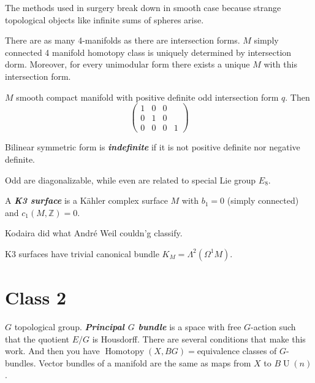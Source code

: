 \begin{remark}
	The methods used in surgery break down in smooth case because strange topological objects like infinite sums of spheres arise.
\end{remark}

\begin{thm}[Freedman, 1982]
	There are as many 4-manifolds as there are intersection forms. $M$ simply connected 4 manifold homotopy class is uniquely determined by intersection dorm. Moreover, for every unimodular form there exists a unique $M$ with this intersection form.
\end{thm}

\begin{thm}[Donaldson, 1986]\leavevmode
	$M$ smooth compact manifold with positive definite odd intersection form $q$. Then
	\[\begin{pmatrix} 1&0&0\\0&1&0\\0&0&0&1 \end{pmatrix} \]
\end{thm}

\begin{defn}
	Bilinear symmetric form is \textit{\textbf{indefinite}} if it is not positive definite nor negative definite.
\end{defn}

\begin{thm}\leavevmode
	Odd are diagonalizable, while even are related to special Lie group $E_8$.
\end{thm}

\begin{defn}
	A \textit{\textbf{K3 surface}} is a K\"ahler complex surface $M$ with $b_1=0$ (simply connected) and $c_1(M,\mathbb{Z})=0$.
\end{defn}

Kodaira did what Andr\'e Weil couldn'g classify.

 \begin{thm}
	K3 surfaces have trivial canonical bundle $K_{M}=\Lambda^2(\Omega^1M)$.
\end{thm}

\section{Class 2}

$G$ topological group. \textit{\textbf{Principal $G$ bundle}} is a space with free $G$-action such that the quotient $E/G$ is Housdorff. There are several conditions that make this work. And then you have $\operatorname{Homo t o py}(X,BG)=$equivalence classes of $G$-bundles.
Vector bundles of a manifold are the same as maps from $X$ to $B\operatorname{U}(n)$.

